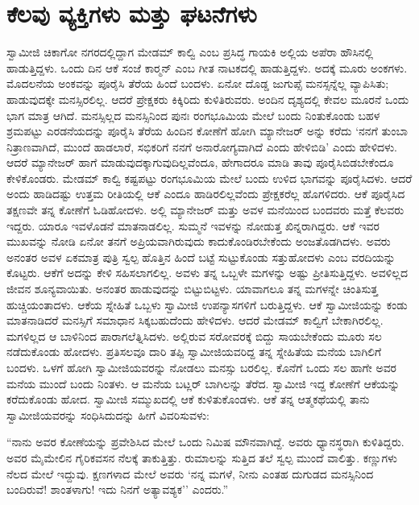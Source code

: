 
\chapter{ಕೆಲವು ವ್ಯಕ್ತಿಗಳು ಮತ್ತು ಘಟನೆಗಳು }

 ಸ್ವಾಮೀಜಿ ಚಿಕಾಗೋ ನಗರದಲ್ಲಿದ್ದಾಗ ಮೇಡಮ್ ಕಾಲ್ವಿ ಎಂಬ ಪ್ರಸಿದ್ಧ ಗಾಯಕಿ ಅಲ್ಲಿಯ ಅಪೆರಾ ಹೌಸಿನಲ್ಲಿ ಹಾಡುತ್ತಿದ್ದಳು. ಒಂದು ದಿನ ಆಕೆ ಸಂಜೆ ಕಾರ್‍ಮನ್ ಎಂಬ ಗೀತ ನಾಟಕದಲ್ಲಿ ಹಾಡುತ್ತಿದ್ದಳು. ಅದಕ್ಕೆ ಮೂರು ಅಂಕಗಳು. ಮೊದಲನೆಯ ಅಂಕವನ್ನು ಪೂರೈಸಿ ತೆರೆಯ ಹಿಂದೆ ಬಂದಳು. ಏನೋ ದೊಡ್ಡ ಜುಗುಪ್ಸೆ ಮನಸ್ಸನ್ನೆಲ್ಲ ವ್ಯಾಪಿಸಿತು; ಹಾಡುವುದಕ್ಕೇ ಮನಸ್ಸಿರಲಿಲ್ಲ. ಆದರೆ ಪ್ರೇಕ್ಷಕರು ಕಿಕ್ಕಿರಿದು ಕುಳಿತಿರುವರು. ಅಂದಿನ ದೃಶ್ಯದಲ್ಲಿ ಕೇವಲ ಮೂರನೆ ಒಂದು ಭಾಗ ಮಾತ್ರ ಆಗಿದೆ. ಮನಸ್ಸಿಲ್ಲದ ಮನಸ್ಸಿನಿಂದ ಪುನಃ ರಂಗಭೂಮಿಯ ಮೇಲೆ ಬಂದು ನಿಂತುಕೊಂಡು ಬಹಳ ಶ್ರಮಪಟ್ಟು ಎರಡನೆಯದನ್ನು ಪೂರೈಸಿ ತೆರೆಯ ಹಿಂದಿನ ಕೋಣೆಗೆ ಹೋಗಿ ಮ್ಯಾನೇಜರ್ ಅನ್ನು ಕರೆದು ‘ನನಗೆ ತುಂಬಾ ನಿತ್ರಾಣವಾಗಿದೆ, ಮುಂದೆ ಹಾಡಲಾರೆ, ಸಭಿಕರಿಗೆ ನನಗೆ ಅನಾರೋಗ್ಯವಾಗಿದೆ ಎಂದು ಹೇಳಿಬಿಡಿ’ ಎಂದು ಹೇಳಿದಳು. ಆದರೆ ಮ್ಯಾನೇಜರ್ ಹಾಗೆ ಮಾಡುವುದಕ್ಕಾಗುವುದಿಲ್ಲವೆಂದೂ, ಹೇಗಾದರೂ ಮಾಡಿ ತಾವು ಪೂರೈಸಿಬಿಡಬೇಕೆಂದೂ ಕೇಳಿಕೊಂಡರು. ಮೇಡಮ್ ಕಾಲ್ವಿ ಕಷ್ಟಪಟ್ಟು ರಂಗಭೂಮಿಯ ಮೇಲೆ ಬಂದು ಉಳಿದ ಭಾಗವನ್ನು ಪೂರೈಸಿದಳು. ಆದರೆ ಅಂದು ಹಾಡಿದಷ್ಟು ಉತ್ತಮ ರೀತಿಯಲ್ಲಿ ಆಕೆ ಎಂದೂ ಹಾಡಿರಲಿಲ್ಲವೆಂದು ಪ್ರೇಕ್ಷಕರೆಲ್ಲ ಹೊಗಳಿದರು. ಆಕೆ ಪೂರೈಸಿದ ತಕ್ಷಣವೇ ತನ್ನ ಕೋಣೆಗೆ ಓಡಿಹೋದಳು. ಅಲ್ಲಿ ಮ್ಯಾನೇಜರ್ ಮತ್ತು ಅವಳ ಮನೆಯಿಂದ ಬಂದವರು ಮತ್ತೆ ಕೆಲವರು ಇದ್ದರು. ಯಾರೂ ಇವಳೊಡನೆ ಮಾತನಾಡಲಿಲ್ಲ. ಸುಮ್ಮನೆ ಇವಳನ್ನು ನೋಡುತ್ತ ಖಿನ್ನರಾಗಿದ್ದರು. ಆಕೆ ಇವರ ಮುಖವನ್ನು ನೋಡಿ ಏನೋ ತನಗೆ ಅಪ್ರಿಯವಾಗಿರುವುದು ಕಾದುಕೊಂಡಿರಬೇಕೆಂದು ಅಂಜತೊಡಗಿದಳು. ಅವರು ಅನಂತರ ಅವಳ ಏಕಮಾತ್ರ ಪುತ್ರಿ ಸ್ವಲ್ಪ ಹೊತ್ತಿನ ಹಿಂದೆ ಬಟ್ಟೆ ಸುಟ್ಟುಕೊಂಡು ಸತ್ತುಹೋದಳು ಎಂಬ ವರದಿಯನ್ನು ಕೊಟ್ಟರು. ಆಕೆಗೆ ಅದನ್ನು ಕೇಳಿ ಸಹಿಸಲಾಗಲಿಲ್ಲ. ಅವಳು ತನ್ನ ಒಬ್ಬಳೇ ಮಗಳನ್ನು ಅಷ್ಟು ಪ್ರೀತಿಸುತ್ತಿದ್ದಳು. ಅವಳಿಲ್ಲದ ಜೀವನ ಶೂನ್ಯವಾಯಿತು. ಅನಂತರ ಹಾಡುವುದನ್ನು ಬಿಟ್ಟುಬಿಟ್ಟಳು. ಯಾವಾಗಲೂ ತನ್ನ ಮಗಳನ್ನೇ ಚಿಂತಿಸುತ್ತ ಹುಚ್ಚಿಯಂತಾದಳು. ಆಕೆಯ ಸ್ನೇಹಿತೆ ಒಬ್ಬಳು ಸ್ವಾಮೀಜಿ ಉಪನ್ಯಾಸಗಳಿಗೆ ಬರುತ್ತಿದ್ದಳು. ಆಕೆ ಸ್ವಾಮೀಜಿಯನ್ನು ಕಂಡು ಮಾತನಾಡಿದರೆ ಮನಸ್ಸಿಗೆ ಸಮಾಧಾನ ಸಿಕ್ಕಬಹುದೆಂದು ಹೇಳಿದಳು. ಆದರೆ ಮೇಡಮ್ ಕಾಲ್ವಿಗೆ ಬೇಕಾಗಿರಲಿಲ್ಲ. ಮಗಳಿಲ್ಲದ ಆ ಬಾಳಿನಿಂದ ಪಾರಾಗಲೆತ್ನಿಸಿದಳು. ಅಲ್ಲಿರುವ ಸರೋವರಕ್ಕೆ ಬಿದ್ದು ಸಾಯಬೇಕೆಂದು ಮೂರು ಸಲ ನಡೆದುಕೊಂಡು ಹೋದಳು. ಪ್ರತಿಸಲವೂ ದಾರಿ ತಪ್ಪಿ ಸ್ವಾಮೀಜಿಯವರಿದ್ದ ತನ್ನ ಸ್ನೇಹಿತೆಯ ಮನೆಯ ಬಾಗಿಲಿಗೆ ಬಂದಳು. ಒಳಗೆ ಹೋಗಿ ಸ್ವಾಮೀಜಿಯವರನ್ನು ನೋಡಲು ಮನಸ್ಸು ಬರಲಿಲ್ಲ. ಕೊನೆಗೆ ಒಂದು ಸಲ ಹಾಗೇ ಅವರ ಮನೆಯ ಮುಂದೆ ಬಂದು ನಿಂತಳು. ಆ ಮನೆಯ ಬಟ್ಲರ್ ಬಾಗಿಲನ್ನು ತೆರೆದ. ಸ್ವಾಮೀಜಿ ಇದ್ದ ಕೋಣೆಗೆ ಆಕೆಯನ್ನು ಕರೆದುಕೊಂಡು ಹೋದ. ಸ್ವಾಮೀಜಿ ಸಮ್ಮುಖದಲ್ಲಿ ಆಕೆ ಕುಳಿತುಕೊಂಡಳು. ಆಕೆ ತನ್ನ ಆತ್ಮಕಥೆಯಲ್ಲಿ ತಾನು ಸ್ವಾಮೀಜಿಯವರನ್ನು ಸಂಧಿಸಿದುದನ್ನು ಹೀಗೆ ವಿವರಿಸುವಳು: 

 “ನಾನು ಅವರ ಕೋಣೆಯನ್ನು ಪ್ರವೇಶಿಸಿದ ಮೇಲೆ ಒಂದು ನಿಮಿಷ ಮೌನವಾಗಿದ್ದೆ. ಅವರು ಧ್ಯಾನಸ್ಥರಾಗಿ ಕುಳಿತಿದ್ದರು. ಅವರ ಮೈಮೇಲಿನ ಗೈರಿಕವಸನ ನೆಲಕ್ಕೆ ತಾಕುತ್ತಿತ್ತು. ರುಮಾಲನ್ನು ಸುತ್ತಿದ ತಲೆ ಸ್ವಲ್ಪ ಮುಂದೆ ವಾಲಿತ್ತು. ಕಣ್ಣುಗಳು ನೆಲದ ಮೇಲೆ ಇದ್ದುವು. ಕ್ಷಣಗಳಾದ ಮೇಲೆ ಅವರು ‘ನನ್ನ ಮಗಳೆ, ನೀನು ಎಂತಹ ದುಗುಡದ ಮನಸ್ಸಿನಿಂದ ಬಂದಿರುವೆ! ಶಾಂತಳಾಗು! ಇದು ನಿನಗೆ ಅತ್ಯಾವಶ್ಯಕ'’ ಎಂದರು.” 

